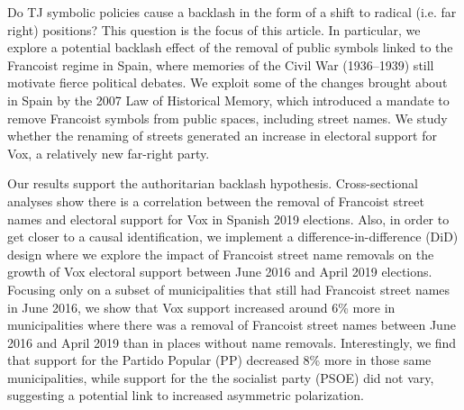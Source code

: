 \documentclass[12pt, notitlepage]{article}
\begin{document}

Do TJ symbolic policies cause a backlash in the form of a shift to radical (i.e. far right) positions?
This question is the focus of this article.
In particular, we explore a potential backlash effect of the removal of public symbols linked to the Francoist regime in Spain, where memories of the Civil War (1936--1939) still motivate fierce political debates. We exploit some of the changes brought about in Spain by the 2007 Law of Historical Memory, which introduced a mandate to remove Francoist symbols from public spaces, including street names. We study whether the renaming of streets generated an increase in electoral support for Vox, a relatively new far-right party.

Our results support the authoritarian backlash hypothesis.
Cross-sectional analyses show there is a correlation between the removal of Francoist street names and electoral support for Vox in Spanish 2019 elections.
Also, in order to get closer to a causal identification, we implement a difference-in-difference (DiD) design where we explore the impact of Francoist street name removals on the growth of Vox electoral support between June 2016 and April 2019 elections.
Focusing only on a subset of municipalities that still had Francoist street names in June 2016, we show that Vox support increased around 6\% more in municipalities where there was a removal of Francoist street names between June 2016 and April 2019 than in places without name removals.
Interestingly, we find that support for the Partido Popular (PP) decreased 8\% more in those same municipalities, while support for the the socialist party (PSOE) did not vary, suggesting a potential link to increased asymmetric polarization.
\end{document}
